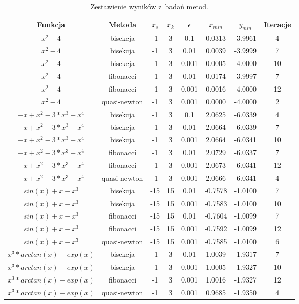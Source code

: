 \documentclass{classrep}
\begin{document}
\begin{table}[H]
\begin{center}
\begin{tabular}{|c|c|c|c|c|c|c|c|}
\hline Funkcja & Metoda & $x_s$ & $x_k$ & $\epsilon$ & $x_{min}$ & $y_{min}$ & Iteracje \\
\hline $x^2 - 4$ & bisekcja & -1 & 3 & 0.1 & 0.0313 & -3.9961 & 4\\
\hline $x^2 - 4$ & bisekcja & -1 & 3 & 0.01 & 0.0039 & -3.9999 & 7\\
\hline $x^2 - 4$ & bisekcja & -1 & 3 & 0.001 & 0.0005 & -4.0000 & 10 \\
\hline $x^2 - 4$ & fibonacci & -1 & 3 & 0.01 & 0.0174 & -3.9997 & 7\\
\hline $x^2 - 4$ & fibonacci & -1 & 3 & 0.001 & 0.0016 & -4.0000 & 12 \\
\hline $x^2 - 4$ & quasi-newton & -1 & 3 & 0.001 & 0.0000 & -4.0000 & 2\\
\hline $-x + x^2 - 3*x^3 + x^4$ & bisekcja & -1 & 3 & 0.1 & 2.0625 & -6.0339 & 4 \\
\hline $-x + x^2 - 3*x^3 + x^4$ & bisekcja & -1 & 3 & 0.01 & 2.0664 & -6.0339 & 7 \\
\hline $-x + x^2 - 3*x^3 + x^4$ & bisekcja & -1 & 3 & 0.001 & 2.0664 & -6.0341 &10 \\
\hline $-x + x^2 - 3*x^3 + x^4$ & fibonacci & -1 & 3 & 0.01 & 2.0729 & -6.0337 & 7 \\
\hline $-x + x^2 - 3*x^3 + x^4$ & fibonacci & -1 & 3 & 0.001 & 2.0673 & -6.0341 & 12 \\
\hline $-x + x^2 - 3*x^3 + x^4$ & quasi-newton & -1 & 3 & 0.001 & 2.0666 & -6.0341 & 4\\
\hline $sin(x)+x-x^3$ & bisekcja & -15 & 15 & 0.01 & -0.7578 & -1.0100 & 7\\
\hline $sin(x)+x-x^3$ & bisekcja & -15 & 15 & 0.001 & -0.7583 & -1.0100 & 10\\
\hline $sin(x)+x-x^3$ & fibonacci & -15 & 15 & 0.01 & -0.7604 & -1.0099 & 7 \\
\hline $sin(x)+x-x^3$ & fibonacci & -15 & 15 & 0.001 & -0.7592 & -1.0099 & 12\\
\hline $sin(x)+x-x^3$ & quasi-newton & -15 & 15 & 0.001 & -0.7585 & -1.0100 & 6 \\
\hline $x^3*arctan(x)-exp(x)$ & bisekcja & -1 & 3 & 0.01 & 1.0039 & -1.9317 & 7 \\
\hline $x^3*arctan(x)-exp(x)$ & bisekcja & -1 & 3 & 0.001 & 1.0005 & -1.9327 & 10\\
\hline $x^3*arctan(x)-exp(x)$ & fibonacci & -1 & 3 & 0.001 & 1.0016 & -1.9327  & 12\\
\hline $x^3*arctan(x)-exp(x)$ & quasi-newton & -1 & 3 & 0.001 & 0.9685 & -1.9350 & 4 \\
\hline
\end{tabular} 
				\caption{Zestawienie wyników z~badań metod.}
		\end{center}
	\end{table}
	
\end{document}
